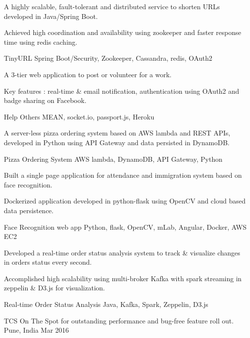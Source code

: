 \documentclass[]{awesome-cv}
\begin{document}
\begin{cventries}
	\cvprojectentry
	{
	\begin{cvitems}
    	\item {A highly scalable, fault-tolerant and distributed service to shorten URLs developed in Java/Spring Boot. }
    	\item {Achieved high coordination and availability using zookeeper and faster response time using redis caching.}
	\end{cvitems}
	}
	{TinyURL}
	{Spring Boot/Security, Zookeeper, Cassandra, redis, OAuth2}
	\cvprojectentry
	{
	\begin{cvitems}
    	\item {A 3-tier web application to post or volunteer for a work.}
    	\item {Key features : real-time \& email notification, authentication using OAuth2 and badge sharing on Facebook.}
	\end{cvitems}
	}
	{Help Others}
	{MEAN, socket.io, passport.js, Heroku}
	\cvprojectentry
	{
	\begin{cvitems}
    	\item {A server-less pizza ordering system based on AWS lambda and REST APIs, developed in Python using API Gateway and data persisted in DynamoDB.}
	\end{cvitems}
	}
	{Pizza Ordering System}
	{AWS lambda, DynamoDB, API Gateway, Python}
	\cvprojectentry
	{
	\begin{cvitems}
    	\item {Built a single page application for attendance and immigration system based on face recognition.}
    	\item {Dockerized application developed in python-flask using OpenCV and cloud based data persistence.}
	\end{cvitems}
	}
	{Face Recognition web app}
	{Python, flask, OpenCV, mLab, Angular, Docker, AWS EC2}
	\cvprojectentry
	{
	\begin{cvitems}
    	\item {Developed a real-time order status analysis system to track \& visualize changes in orders status every second.}
    	\item {Accomplished high scalability using multi-broker Kafka with spark streaming in zeppelin \& D3.js for visualization.}
	\end{cvitems}
	}
	{Real-time Order Status Analysis}
	{Java, Kafka, Spark, Zeppelin, D3.js}
    \vspace{-2mm}
\end{cventries}
\vspace{-3mm}
\begin{cvhonors}
	\cvhonor
	{TCS On The Spot}
	{for outstanding performance and bug-free feature roll out.}
	{Pune, India}
	{Mar 2016}
\end{cvhonors}
\ 
\end{document}
